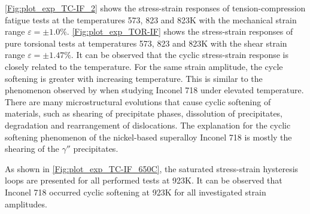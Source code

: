 \ref{Fig:plot_exp_TC-IF_2} shows the stress-strain responses of tension-compression fatigue tests at the temperatures 573, 823 and 823K with the mechanical strain range $\varepsilon=\pm1.0\%$. \ref{Fig:plot_exp_TOR-IF} shows the stress-strain responses of pure torsional tests at temperatures 573, 823 and 823K with the shear strain range $\varepsilon=\pm1.47\%$. It can be observed that the cyclic stress-strain response is closely related to the temperature. For the same strain amplitude, the cycle softening is greater with increasing temperature. This is similar to the phenomenon observed by \cite{Fournier1977,Xiao2005,kim1988elevated,Schlesinger2017} when studying Inconel 718 under elevated temperature.
There are many microstructural evolutions that cause cyclic softening of materials, such as shearing of precipitate phases, dissolution of precipitates, degradation and rearrangement of dislocations.
The explanation for the cyclic softening phenomenon of the nickel-based superalloy Inconel 718 is mostly the shearing of the $\gamma ''$ precipitates.

As shown in \ref{Fig:plot_exp_TC-IF_650C}, the saturated stress-strain hysteresis loops are presented for all performed tests at 923K.
It can be observed that Inconel 718 occurred cyclic softening at 923K for all investigated strain amplitudes.


